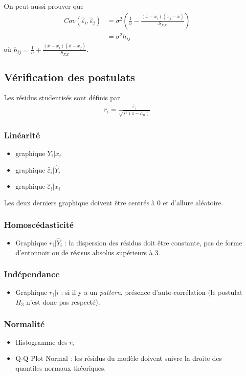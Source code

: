 \documentclass[10pt, french]{article}
\begin{document}
\begin{multicols*}{3}
On peut aussi prouver que
\begin{align*}
Cov(\hat{\varepsilon}_i, \hat{\varepsilon}_j) & = \sigma^2 \left(\frac{1}{n} - \frac{(\bar{x} - x_i)(x_j - \bar{x})}{S_{XX}} \right) \\
	& = \sigma^2 h_{ij}
\end{align*}
où $h_{ij} = \frac{1}{n} + \frac{(\bar{x}-x_i)(\bar{x}-x_j)}{S_{XX}}$.
\subsection*{Vérification des postulats}
Les résidus studentisés sont définis par
\begin{align*}
r_i = \frac{\hat{\varepsilon}_i}{\sqrt{s^2(1 - h_{ii})}}
\end{align*}
\subsubsection*{Linéarité}
\begin{itemize}
\item graphique $Y_i | x_i$
\item graphique $\hat{\varepsilon}_i | \hat{Y}_i$
\item graphique $\hat{\varepsilon}_i | x_i$
\end{itemize}
Les deux derniers graphique doivent être centrés à 0 et d'allure aléatoire.

\subsubsection*{Homoscédasticité}
\begin{itemize}
\item Graphique $r_i | \hat{Y}_i$ : la dispersion des résidus doit être constante, pas de forme d'entonnoir ou de résisus absolus supérieurs à 3.
\end{itemize}

\subsubsection*{Indépendance}
\begin{itemize}
\item Graphique $r_i|i$ : si il y a un \textit{pattern}, présence d'auto-corrélation (le postulat $H_3$ n'est donc pas respecté).
\end{itemize}

\subsubsection*{Normalité}
\begin{itemize}
\item Histogramme des $r_i$
\item Q-Q Plot Normal : les résidus du modèle doivent suivre la droite des quantiles normaux théoriques.
\end{itemize}





\end{multicols*}
\end{document}
